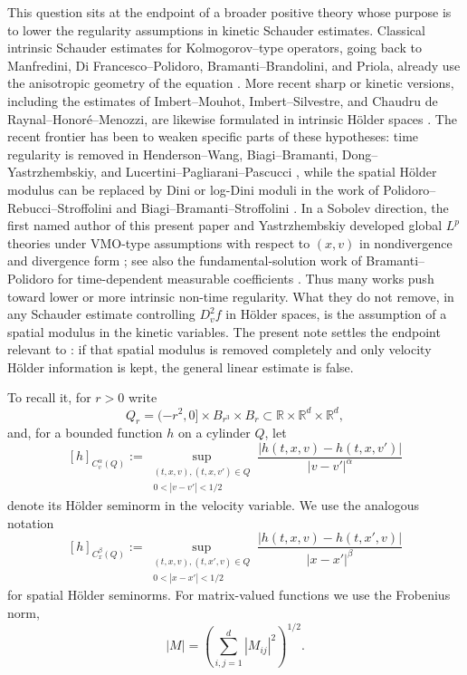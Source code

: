 \documentclass[11pt,reqno]{amsart}
\numberwithin{equation}{section}
\theoremstyle{remark}
\newcommand{\R}{\mathbb{R}}
\begin{document}
This question sits at the endpoint of a broader positive theory whose
purpose is to lower the regularity assumptions in kinetic Schauder
estimates.  Classical intrinsic Schauder estimates for Kolmogorov--type
operators, going back to Manfredini, Di Francesco--Polidoro,
Bramanti--Brandolini, and Priola, already use the anisotropic geometry
of the equation \cite{Manfredini,DiFrancescoPolidoro,BramantiBrandolini,Priola}.
More recent sharp or kinetic versions, including the estimates of
Imbert--Mouhot, Imbert--Silvestre, and Chaudru de Raynal--Honor\'e--Menozzi,
are likewise formulated in intrinsic H\"older spaces
\cite{ImbertMouhot,ImbertSilvestreSchauder,ChaudruHonoreMenozzi}.  The
recent frontier has been to weaken specific parts of these hypotheses:
time regularity is removed in Henderson--Wang, Biagi--Bramanti,
Dong--Yastrzhembskiy, and Lucertini--Pagliarani--Pascucci
\cite{HW,BiagiBramanti,DongYastrzhembskiySchauder,LucertiniPagliaraniPascucciRegularity,LucertiniPagliaraniPascucciSchauder},
while the spatial H\"older modulus can be replaced by Dini or
log-Dini moduli in the work of Polidoro--Rebucci--Stroffolini and
Biagi--Bramanti--Stroffolini
\cite{PolidoroRebucciStroffolini,BiagiBramantiStroffolini}.  In a
Sobolev direction, the first named author of this present paper and Yastrzhembskiy developed global \(L^p\)
theories under VMO-type assumptions {with respect to $(x,v)$} in nondivergence and divergence
form \cite{DongYastrzhembskiyLpND,DongYastrzhembskiyLpD}; see also the
fundamental-solution work of Bramanti--Polidoro for time-dependent
measurable coefficients \cite{BramantiPolidoro}.  Thus many works push
toward lower or more intrinsic non-time regularity.  What they do not
remove, in any Schauder estimate controlling \(D_v^2 f\) in H\"older
spaces, is the {assumption} of a spatial modulus in the kinetic variables.
The present note settles the endpoint relevant to \cite[Conjecture~1.3]{HW}:
if that spatial modulus is removed completely and only velocity
H\"older information is kept, the general linear estimate is false.

To recall it, for $r>0$ write
\[
   Q_r=(-r^2,0]\times B_{r^3}\times B_r\subset\R\times\R^d\times\R^d,
\]
and, for a bounded function $h$ on a cylinder $Q$, let
\[
   [h]_{C_v^\alpha(Q)}
   :=\sup_{\substack{(t,x,v),(t,x,v')\in Q\\0<|v-v'|<1/2}}
       \frac{|h(t,x,v)-h(t,x,v')|}{|v-v'|^\alpha}
\]
denote its H\"older seminorm in the velocity variable.  We use the analogous notation
\[
   [h]_{C_x^\beta(Q)}
   :=\sup_{\substack{(t,x,v),(t,x',v)\in Q\\0<|x-x'|<1/2}}
       \frac{|h(t,x,v)-h(t,x',v)|}{|x-x'|^\beta}
\]
for spatial H\"older seminorms.  For matrix-valued functions we use the
Frobenius norm,
\[
   |M|=\left(\sum_{i,j=1}^d |M_{ij}|^2\right)^{1/2}.
\]
\end{document}

